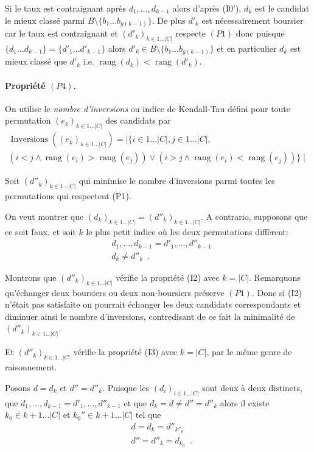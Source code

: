 \documentclass{article}
\DeclareMathOperator{\rang}{rang}
\DeclareMathOperator{\Inversions}{Inversions}
\begin{document}
 Si le taux est contraignant après $d_1,\ldots, d_{k-1}$
 alors d'après (I0'),
 $d_k$ est le candidat le mieux classé parmi
 $B \setminus \{b_1\ldots b_{g(k-1)}\}$.
 De plus $d'_k$ est nécessairement boursier 
 car le taux est contraignant
 et
 $(d'_k)_{k\in 1 \ldots |C|}$ respecte $(P1)$ donc
 puisque $\{d_1\ldots d_{k-1}\}=\{d'_1\ldots d'_{k-1}\}$ alors 
 $d'_k \in B \setminus \{b_1\ldots b_{g(k-1)}\}$ et
 en particulier $d_k$ est mieux classé que $d'_k$ i.e. $\rang(d_k) < \rang(d'_k)$.

 

 \medskip
 
 \paragraph{Propriété $(P4)$.}
 On utilise
 le \emph{nombre d'inversions} ou indice de Kendall-Tau
 défini pour toute permutation $(e_k)_{k\in 1 \ldots |C|}$
 des candidats par
\begin{multline*}
\Inversions((e_k)_{k\in 1 \ldots |C|}) = \mid \{ i \in 1 \ldots |C|, j \in 1 \ldots |C|,\\ (i < j \land \rang(e_i) > \rang(e_j)) \lor (i > j \land \rang(e_i) < \rang(e_j))\}\mid \enspace
\end{multline*}

Soit $(d''_k)_{k\in 1 \ldots |C|}$ qui minimise 
le nombre d'inversions
 parmi toutes les permutations qui respectent (P1).

On veut montrer que $(d_k)_{k\in 1 \ldots |C|}= (d''_k)_{k\in 1 \ldots |C|}$.
A contrario, supposons que ce soit faux,
et soit $k$ le plus petit indice où les deux permutations diffèrent:
\begin{align*}
&d_1,\ldots , d_{k-1}=d'_1,\ldots , d''_{k-1}\\
& d_k \neq d''_{k}\enspace.
\end{align*}


Montrons que 
$(d''_k)_{k\in 1 \ldots |C|}$ vérifie la propriété (I2) avec $k=|C|$.
Remarquons qu'échanger deux boursiers ou deux non-boursiers préserve
$(P1)$.
Donc si (I2) n'était pas satisfaite on pourrait échanger
les deux candidats correspondants et diminuer ainsi le nombre d'inversions,
contredisant de ce fait la minimalité de $(d''_k)_{k\in 1 \ldots |C|}$.

Et 
$(d''_k)_{k\in 1 \ldots |C|}$ vérifie la propriété (I3) avec $k=|C|$,
par le même genre de raisonnement.

\medskip

Posons $d=d_k$ et $d''=d''_k$.
Puisque les $(d_i)_{i\in 1\ldots |C|}$ sont deux à deux distincts,
que $d_1,\ldots , d_{k-1}=d'_1,\ldots , d''_{k-1}$ et que $d_k = d \neq d'' =d''_k$
alors il existe $k_0 \in k+1 \ldots |C|$ et $k_0''\in k+1 \ldots |C|$ tel que
\begin{align*}
&d = d_k = d''_{k''_0}\\
&d'' = d''_k = d_{k_0}\enspace.
\end{align*}
\end{document}
